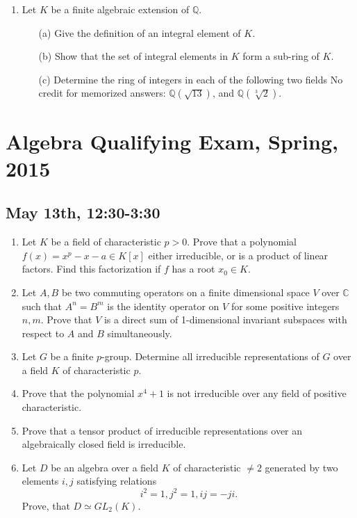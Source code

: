 \documentclass{article}
\begin{document}
\begin{enumerate}
    \item Let \(K\) be a finite algebraic extension of \(\mathbb{Q}\).
    \begin{itemize}
        \item[(a)] Give the definition of an integral element of \(K\).
        \item[(b)] Show that the set of integral elements in \(K\) form a sub-ring of \(K\).
        \item[(c)] Determine the ring of integers in each of the following two fields No credit for memorized answers: \(\mathbb{Q}(\sqrt{13})\), and \(\mathbb{Q}(\sqrt[3]{2})\).
    \end{itemize}
\end{enumerate}

\section*{Algebra Qualifying Exam, Spring, 2015}
\subsection*{May 13th, 12:30-3:30}

\begin{enumerate}
    \item Let \(K\) be a field of characteristic \(p>0\). Prove that a polynomial \(f(x)=x^{p}-x-a\in K[x]\) either irreducible, or is a product of linear factors. Find this factorization if \(f\) has a root \(x_{0}\in K\).

    \item Let \(A,B\) be two commuting operators on a finite dimensional space \(V\) over \(\mathbb{C}\) such that \(A^{n}=B^{m}\) is the identity operator on \(V\) for some positive integers \(n,m\). Prove that \(V\) is a direct sum of 1-dimensional invariant subspaces with respect to \(A\) and \(B\) simultaneously.

    \item Let \(G\) be a finite \(p\)-group. Determine all irreducible representations of \(G\) over a field \(K\) of characteristic \(p\).

    \item Prove that the polynomial \(x^{4}+1\) is not irreducible over any field of positive characteristic.

    \item Prove that a tensor product of irreducible representations over an algebraically closed field is irreducible.

    \item Let \(D\) be an algebra over a field \(K\) of characteristic \(\neq 2\) generated by two elements \(i,j\) satisfying relations
    \[i^{2}=1, j^{2}=1, ij=-ji.\]
    Prove, that \(D\simeq GL_{2}(K)\).
\end{enumerate}
\end{document}
